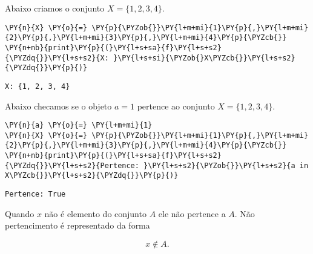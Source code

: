 \documentclass{book}
\begin{document}
        \begin{exemplo}
            Abaixo criamos o conjunto $X=\{1,2,3,4\}$.



\begin{Verbatim}[commandchars=\\\{\},frame=single,fontsize=\small, xleftmargin=0.5em]
\PY{n}{X} \PY{o}{=} \PY{p}{\PYZob{}}\PY{l+m+mi}{1}\PY{p}{,}\PY{l+m+mi}{2}\PY{p}{,}\PY{l+m+mi}{3}\PY{p}{,}\PY{l+m+mi}{4}\PY{p}{\PYZcb{}}
\PY{n+nb}{print}\PY{p}{(}\PY{l+s+sa}{f}\PY{l+s+s2}{\PYZdq{}}\PY{l+s+s2}{X: }\PY{l+s+si}{\PYZob{}X\PYZcb{}}\PY{l+s+s2}{\PYZdq{}}\PY{p}{)}
\end{Verbatim}

\begin{Verbatim}[commandchars=\\\{\},frame=leftline,fontsize=\small, xleftmargin=0.5em]
X: {1, 2, 3, 4}
\end{Verbatim}

        \end{exemplo}

        \begin{exemplo}
            Abaixo checamos se o objeto $a=1$ pertence ao conjunto $X=\{1,2,3,4\}$.


\begin{Verbatim}[commandchars=\\\{\},frame=single,fontsize=\small, xleftmargin=0.5em]
\PY{n}{a} \PY{o}{=} \PY{l+m+mi}{1}
\PY{n}{X} \PY{o}{=} \PY{p}{\PYZob{}}\PY{l+m+mi}{1}\PY{p}{,}\PY{l+m+mi}{2}\PY{p}{,}\PY{l+m+mi}{3}\PY{p}{,}\PY{l+m+mi}{4}\PY{p}{\PYZcb{}}
\PY{n+nb}{print}\PY{p}{(}\PY{l+s+sa}{f}\PY{l+s+s2}{\PYZdq{}}\PY{l+s+s2}{Pertence: }\PY{l+s+s2}{\PYZob{}}\PY{l+s+s2}{a in X\PYZcb{}}\PY{l+s+s2}{\PYZdq{}}\PY{p}{)}
\end{Verbatim}

\begin{Verbatim}[commandchars=\\\{\},frame=leftline,fontsize=\small, xleftmargin=0.5em]
Pertence: True
\end{Verbatim}

        \end{exemplo}

        Quando $x$ não é elemento do conjunto $A$ ele não pertence a $A$. Não pertencimento é representado da forma

        $$ x \notin A \text{.}$$
\end{document}
